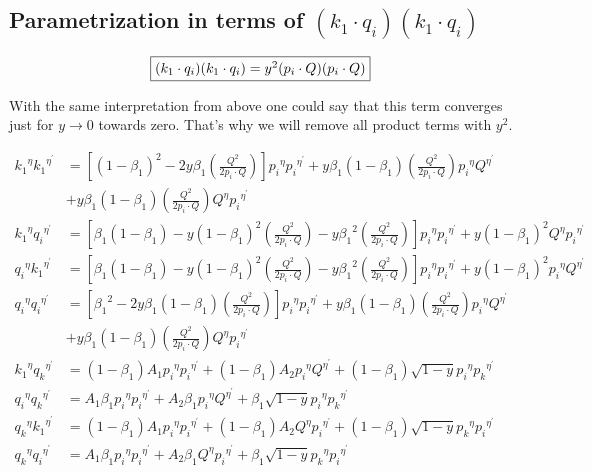 \subsection{Parametrization in terms of $ (k_1 \cdot q_i )(k_1 \cdot q_i) $}
\begin{equation}
	\begin{aligned}
		\fbox{$  (k_1 \cdot q_i )(k_1 \cdot q_i)  = y^2(p_i \cdot Q)(p_i \cdot Q) $}
    \end{aligned}
\end{equation}

With the same interpretation from above one could say that this term converges just for $ y \rightarrow 0 $ towards zero. That's why we will remove all product terms with $ y^2 $. 

\begin{equation}
\begin{split}
{k_1}^{{\eta}}{k_1}^{{\eta}^{\prime}}&=[(1-\beta_1)^2-2y {\beta_1} (\frac{Q^2}{2p_i \cdot Q})] {p_i}^{{\eta}}{p_i}^{{\eta}^{\prime}}+y {\beta_1}(1-\beta_1) (\frac{Q^2}{2p_i \cdot Q}){p_i}^{{\eta}}{Q}^{{\eta}^{\prime}}\\
&+y {\beta_1}(1-\beta_1) (\frac{Q^2}{2p_i \cdot Q}){Q}^{{\eta}}{p_i}^{{\eta}^{\prime}}\\
{k_1}^{{\eta}}{q_i}^{{\eta}^{\prime}}&=[\beta_1(1-\beta_1)-y (1-{\beta_1})^2 (\frac{Q^2}{2p_i \cdot Q})-y {\beta_1}^2 (\frac{Q^2}{2p_i \cdot Q})] {p_i}^{{\eta}}{p_i}^{{\eta}^{\prime}}+y (1-\beta_1)^2 {Q}^{{\eta}}{p_i}^{{\eta}^{\prime}}\\
{q_i}^{{\eta}}{k_1}^{{\eta}^{\prime}}&=[\beta_1(1-\beta_1)-y (1-{\beta_1})^2 (\frac{Q^2}{2p_i \cdot Q})-y {\beta_1}^2 (\frac{Q^2}{2p_i \cdot Q})] {p_i}^{{\eta}}{p_i}^{{\eta}^{\prime}}+y (1-\beta_1)^2 {p_i}^{{\eta}}{Q}^{{\eta}^{\prime}}\\
{q_i}^{{\eta}}{q_i}^{{\eta}^{\prime}}&=[{\beta_1}^2 -2y \beta_1 (1-{\beta_1}) (\frac{Q^2}{2p_i \cdot Q})]{p_i}^{{\eta}}{p_i}^{{\eta}^{\prime}}+y {\beta_1}(1-\beta_1) (\frac{Q^2}{2p_i \cdot Q}){p_i}^{{\eta}}{Q}^{{\eta}^{\prime}}\\
&+y {\beta_1}(1-\beta_1) (\frac{Q^2}{2p_i \cdot Q}){Q}^{{\eta}}{p_i}^{{\eta}^{\prime}}\\
{k_1}^{{\eta}}{q_k}^{{\eta}^{\prime}}&= (1-\beta_1)A_1{p_i}^{{\eta}}{{p_i}^{{\eta}^{\prime}}}+(1-\beta_1)A_2{p_i}^{{\eta}}{{Q}^{{\eta}^{\prime}}}+(1-\beta_1)\sqrt{1-y}{p_i}^{{\eta}}{{p_k}^{{\eta}^{\prime}}}\\
{q_i}^{{\eta}}{q_k}^{{\eta}^{\prime}}&=A_1\beta_1 {p_i}^{{\eta}}{{p_i}^{{\eta}^{\prime}}}+A_2\beta_1 {p_i}^{{\eta}}{{Q}^{{\eta}^{\prime}}}+\beta_1 \sqrt{1-y}{p_i}^{{\eta}}{{p_k}^{{\eta}^{\prime}}}\\
{q_k}^{\eta}{k_1}^{{{\eta}}^{\prime}}&=(1-\beta_1)A_1{p_i}^{{\eta}}{{p_i}^{{\eta}^{\prime}}}+(1-\beta_1)A_2{Q}^{{\eta}}{{p_i}^{{\eta}^{\prime}}}+(1-\beta_1)\sqrt{1-y}{p_k}^{{\eta}}{{p_i}^{{\eta}^{\prime}}}\\
{q_k}^{\eta}{q_i}^{{{\eta}}^{\prime}}&=A_1\beta_1 {p_i}^{{\eta}}{{p_i}^{{\eta}^{\prime}}}+A_2\beta_1 {Q}^{{\eta}}{{p_i}^{{\eta}^{\prime}}}+\beta_1 \sqrt{1-y}{p_k}^{{\eta}}{{p_i}^{{\eta}^{\prime}}}\\
\end{split}
\end{equation}
\newpage